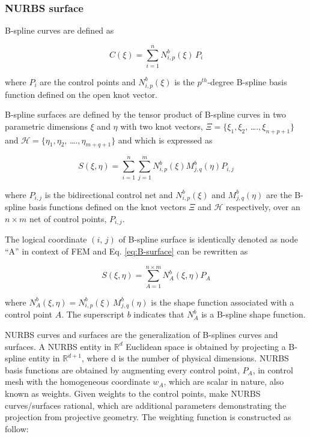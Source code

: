 \documentclass[3p,preprint,12pt]{elsarticle}
\begin{document}
\subsubsection{NURBS surface}

B-spline curves are defined as

\begin{equation}\label{eq:B-spline-C}
C(\xi)=\sum_{i=1}^{n}N^{b}_{i,p}(\xi)\,P_{i}
\end{equation}

where $P_i$ are the control points and $N_{i,p}^{b}(\xi)$ is the $p^{th}$-degree B-spline basis function defined on the open knot vector.

B-spline surfaces are defined by the tensor product of B-spline curves in two parametric dimensions $\xi$ and $\eta$ with two knot vectors, $\Xi=\{\xi_{1},\xi_{2},\,$\ldots.$,\xi_{n+p+1}\}$ and $\mathcal{H}=\{\eta_{1},\eta_{2},\,$\ldots.$,\eta_{m+q+1}\}$ and which is expressed as 

\begin{equation}\label{eq:B-surface}
S(\xi,\eta)=\sum_{i=1}^{n}\sum_{j=1}^{m}N^{b}_{i,p}(\xi)M^{b}_{j,q}(\eta)P_{i,j}
\end{equation}

where $P_{i,j}$ is the bidirectional control net and $N_{i,p}^{b}(\xi)$ and $M_{j,q}^{b}(\eta)$ are the B-spline basis functions defined on the knot vectors $\Xi$ and $\mathcal{H}$ respectively, over an $n \times m$ net of control points, $P_{i,j}$. 

The logical coordinate $(i,\,j)$ of B-spline surface is identically denoted as node \enquote{A} in context of FEM \cite{thai2012static,benson2010isogeometric} and Eq. \cref{eq:B-surface} can be rewritten as

\begin{equation}\label{eq:B-surface-1}
S(\xi,\eta)=\sum_{A=1}^{n\times m}N_{A}^{b}(\xi,\eta)P_{A}
\end{equation}

where $N_{A}^{b}(\xi,\eta)=N^{b}_{i,p}(\xi)\,M^{b}_{j,q}(\eta)$ is the shape function associated with a control point $A$. The superscript $b$ indicates that $N_{A}^{b}$ is a B-spline shape function. 

NURBS curves and surfaces are the generalization of B-splines curves and surfaces. A NURBS entity in $\mathbb{R}^{d}$ Euclidean space is obtained by projecting a B-spline entity in $\mathbb{R}^{d+1}$, where d is the number of physical dimensions. NURBS basis functions are obtained by augmenting every control point, $P_{A}$, in control mesh with the homogeneous coordinate $w_{A}$, which are scalar in nature, also known as weights. Given weights to the control points, make NURBS curves/surfaces rational, which are additional parameters demonstrating the projection from projective geometry. The weighting function is constructed as follow:
\end{document}
